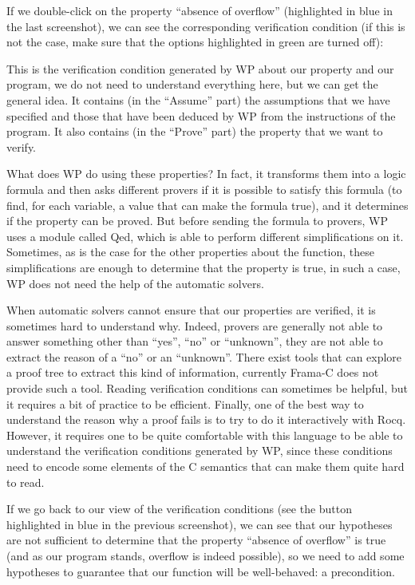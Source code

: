 If we double-click on the property ``absence of overflow''
(highlighted in blue in the last screenshot), we can see the corresponding
verification condition (if this is not the case, make sure that the options
highlighted in green are turned off):





This is the verification condition generated by WP about our property and our
program, we do not need to understand everything here, but we can get the
general idea. It contains (in the ``Assume'' part) the assumptions that
we have specified and those that have been deduced by WP from the
instructions of the program. It also contains (in the ``Prove'' part)
the property that we want to verify.



What does WP do using these properties? In fact, it transforms them
into a logic formula and then asks different provers if it is
possible to satisfy this formula (to find, for each variable, a value
that can make the formula true), and it determines if the property can
be proved. But before sending the formula to provers, WP uses a module
called Qed, which is able to perform different simplifications on it.
Sometimes, as is the case for the other properties about the
 function, these simplifications are enough to determine that
the property is true, in such a case, WP does not need the help of the
automatic solvers.



When automatic solvers cannot ensure that our properties are verified,
it is sometimes hard to understand why. Indeed, provers are generally
not able to answer something other than ``yes'', ``no'' or ``unknown'',
they are not able to extract the reason of a ``no'' or an ``unknown''.
There exist tools that can explore a proof tree to extract this kind of
information, currently Frama-C does not provide such a tool. Reading
verification conditions can sometimes be helpful, but it requires a bit of
practice to be efficient. Finally, one of the best way to understand the reason
why a proof fails is to try to do it interactively with Rocq. However, it
requires one to be quite comfortable with this language to be able to understand
the verification conditions generated by WP, since these conditions
need to encode some elements of the C semantics that can make them quite
hard to read.



If we go back to our view of the verification conditions (see the
button highlighted in blue in the previous screenshot),
we can see that our hypotheses are not
sufficient to determine that the property ``absence of overflow'' is true (and
as our program stands, overflow is indeed possible), so we need to
add some hypotheses to
guarantee that our function will be well-behaved: a precondition.



